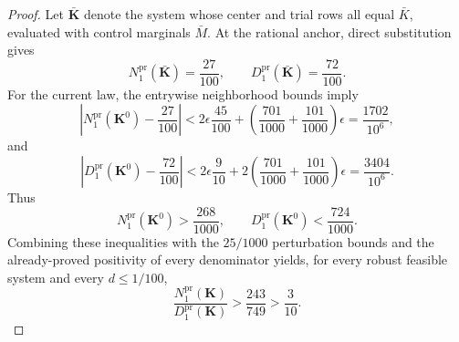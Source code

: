 \documentclass{article}
\begin{document}
\begin{proof}
Let \(\bar{\mathbf K}\) denote the system whose center and trial rows all equal \(\bar K\), evaluated with control marginals \(\bar M\). At the rational anchor, direct substitution gives
\[
 N_1^{\mathrm{pr}}(\bar{\mathbf K})=\frac{27}{100},
 \qquad
 D_1^{\mathrm{pr}}(\bar{\mathbf K})=\frac{72}{100}.
\]
For the current law, the entrywise neighborhood bounds imply
\[
 \left|N_1^{\mathrm{pr}}(\mathbf K^0)-\frac{27}{100}\right|
 <2\epsilon\frac{45}{100}
   +\left(\frac{701}{1000}+\frac{101}{1000}\right)\epsilon
 =\frac{1702}{10^6},
\]
and
\[
 \left|D_1^{\mathrm{pr}}(\mathbf K^0)-\frac{72}{100}\right|
 <2\epsilon\frac9{10}
   +2\left(\frac{701}{1000}+\frac{101}{1000}\right)\epsilon
 =\frac{3404}{10^6}.
\]
Thus
\[
 N_1^{\mathrm{pr}}(\mathbf K^0)>\frac{268}{1000},
 \qquad
 D_1^{\mathrm{pr}}(\mathbf K^0)<\frac{724}{1000}.
\]
Combining these inequalities with the \(25/1000\) perturbation bounds and the already-proved positivity of every denominator yields, for every robust feasible system and every \(d\le1/100\),
\[
 \frac{N_1^{\mathrm{pr}}(\mathbf K)}{D_1^{\mathrm{pr}}(\mathbf K)}
 >\frac{243}{749}>\frac3{10}.
\]


\end{proof}
\end{document}
